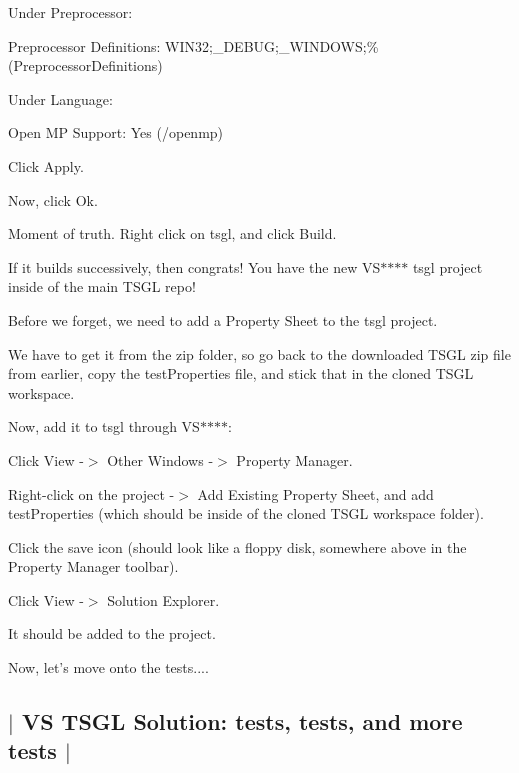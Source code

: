Under {\ttfamily Preprocessor}\-:


\begin{DoxyItemize}
\item {\ttfamily Preprocessor Definitions\-:} W\-I\-N32;\-\_\-\-D\-E\-B\-U\-G;\-\_\-\-W\-I\-N\-D\-O\-W\-S;\%(Preprocessor\-Definitions)
\end{DoxyItemize}

Under {\ttfamily Language}\-:


\begin{DoxyItemize}
\item {\ttfamily Open M\-P Support\-:} Yes (/openmp)
\end{DoxyItemize}

Click {\ttfamily Apply}.

Now, click {\ttfamily Ok}.

Moment of truth. Right click on {\ttfamily tsgl}, and click {\ttfamily Build}.

If it builds successively, then congrats! You have the new V\-S$\ast$$\ast$$\ast$$\ast$ {\ttfamily tsgl} project inside of the main T\-S\-G\-L repo!

Before we forget, we need to add a {\ttfamily Property Sheet} to the {\ttfamily tsgl} project.

We have to get it from the zip folder, so go back to the downloaded T\-S\-G\-L zip file from earlier, copy the {\ttfamily test\-Properties} file, and stick that in the cloned T\-S\-G\-L workspace.

Now, add it to {\ttfamily tsgl} through V\-S$\ast$$\ast$$\ast$$\ast$\-:


\begin{DoxyItemize}
\item Click {\ttfamily View -\/$>$ Other Windows -\/$>$ Property Manager}.
\item {\ttfamily Right-\/click on the project -\/$>$ Add Existing Property Sheet}, and add {\ttfamily test\-Properties} (which should be inside of the cloned T\-S\-G\-L workspace folder).
\item Click the save icon (should look like a floppy disk, somewhere above in the {\ttfamily Property Manager} toolbar).
\item Click {\ttfamily View -\/$>$ Solution Explorer}.
\end{DoxyItemize}

It should be added to the project.

Now, let's move onto the tests.... 

 \subsection*{$\vert$ V\-S T\-S\-G\-L Solution\-: tests, tests, and more tests $\vert$ }

